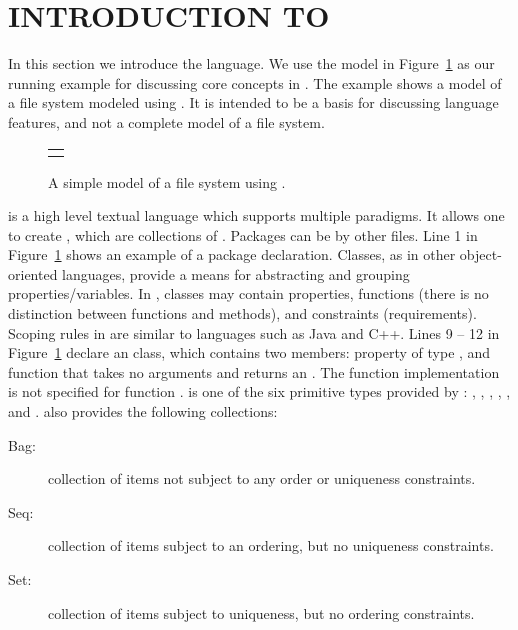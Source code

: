 \section{INTRODUCTION TO \Klang{}}
\label{sec:k-syntax}

In this section we introduce the \Klang{} language. We use the
\Klang{} model in Figure~\ref{fig:fs} as our running example for
discussing core concepts in \Klang{}. The example shows a model of a
file system modeled using \Klang{}. It is intended to be a basis for
discussing language features, and not a complete model of a file
system.

\begin{figure}
  \centering
  \begin{tabular}{c}
    \small
    
    \end{tabular}
  \vspace{0.2cm}
  \caption{A simple model of a file system using \Klang{}.}
  \label{fig:fs}
\end{figure}
  
\Klang{} is a high level textual language which supports multiple
paradigms. It allows one to create , which are
collections of . Packages can be  by
other \Klang{} files. Line 1 in Figure~\ref{fig:fs} shows an example
of a package declaration. Classes, as in other object-oriented
languages, provide a means for abstracting and grouping
properties/variables. In \Klang{}, classes may contain properties,
functions (there is no distinction between functions and methods), and
constraints (requirements). Scoping rules in \Klang{} are similar to
languages such as Java and C++. Lines 9 -- 12 in Figure~\ref{fig:fs}
declare an  class, which contains two members: property
 of type , and function  that takes
no arguments and returns an . The function implementation is
not specified for function .  is one of the
six primitive types provided by \Klang{}: , ,
, , , and . \Klang{}
also provides the following collections:

\begin{description}
\item [Bag:] collection of items not subject to any order
  or uniqueness constraints.
\item [Seq:] collection of items subject to an ordering, but
  no uniqueness constraints.
\item [Set:] collection of items subject to uniqueness, but no
  ordering constraints.
\end{description}

